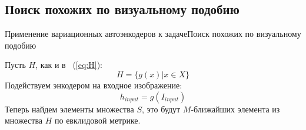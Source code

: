 \documentclass{beamer}
\begin{document}
\subsection{Поиск похожих по визуальному подобию}

\begin{frame}{Применение вариационных автоэнкодеров к задаче}{Поиск похожих по визуальному подобию}

Пусть $H$, как и в ~(\ref{eq:H}): $$H = \{g(x) | x \in X\}$$
Подействуем энкодером на входное изображение: $$h_{input} = g(I_{input})$$
Теперь найдем элементы множества $S$, это будут $M$-ближайших элемента из множества $H$ по евклидовой метрике.

\end{frame}
\end{document}

